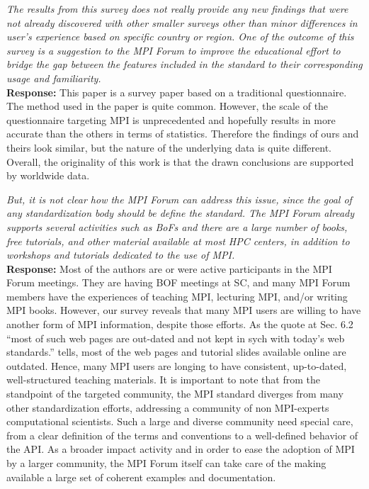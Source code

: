 \documentclass[11pt]{article}
\newcommand{\response}[2]{{\vspace{5mm}\noindent{\bf Comment:} \em #1}\\%
  {\bf Response:} #2}
\begin{document}
\response{The results from this survey does not really provide any
  new findings that were not already discovered with other smaller
  surveys other than minor differences in user's experience based on
  specific country or region. One of the outcome of this survey is a
  suggestion to the MPI Forum to improve the educational effort to
  bridge the gap between the features included in the standard to
  their corresponding usage and familiarity.}
         {This paper is a survey paper based on a traditional
           questionnaire.  The method used in the paper is quite
           common.%
           However, the scale of the
           questionnaire targeting MPI is unprecedented and hopefully
           results in more accurate than the others in terms of
           statistics.
           Therefore the findings of ours and theirs look similar, but
           the nature of the underlying data is quite
           different. Overall, the originality of this work is that
           the drawn conclusions are supported by worldwide data. 
}

\response{But, it is not clear how the MPI Forum can address this
  issue, since the goal of any standardization body should be define
  the standard. The MPI Forum already supports several activities such
  as BoFs and there are a large number of books, free tutorials, and
  other material available at most HPC centers, in addition to
  workshops and tutorials dedicated to the use of MPI.}
{Most of the authors are or were active participants in the MPI Forum
  meetings.  They are having BOF meetings at SC, and many MPI Forum
  members have the experiences of teaching MPI, lecturing MPI, and/or
  writing MPI books. However, our survey reveals that many MPI users
  are willing to have another form of MPI information, despite those
  efforts. As the quote at Sec. 6.2 ``most of such web pages are
  out-dated and not kept in sych with today’s web standards.'' tells,
  most of the web pages and tutorial slides available online are
  outdated. Hence,  many MPI users are longing to have consistent,
  up-to-dated, well-structured teaching materials.
  It is important to note that from the standpoint of the targeted community,
  the MPI standard diverges from many other standardization efforts,
  addressing a community of non MPI-experts computational scientists.
  Such a large and diverse community need special care, from a clear
  definition of the terms and conventions to a well-defined behavior of
  the API. As a broader impact activity and in order to ease the adoption
  of MPI by a larger community, the MPI Forum itself can take care of the
  making available a large set of coherent examples and documentation.
}
\end{document}
